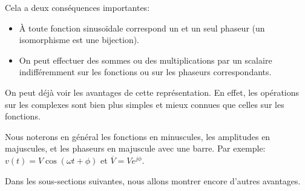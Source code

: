 Cela a deux conséquences importantes:
\begin{itemize}
    \item À toute fonction sinusoïdale correspond un et un seul phaseur
        (un isomorphisme est une bijection).
    \item On peut effectuer des sommes ou des multiplications par un scalaire
        indifféremment sur les fonctions ou sur les phaseurs correspondants.
\end{itemize}

On peut déjà voir les avantages de cette représentation.
En effet,
les opérations sur les complexes sont bien plus simples et mieux connues
que celles sur les fonctions.

Nous noterons en général les fonctions en minuscules,
les amplitudes en majuscules,
et les phaseurs en majuscule avec une barre.
Par exemple: $v(t) = V\cos(\omega t + \phi)$ et
$\overline{V} = Ve^{j\phi}$.

Dans les sous-sections suivantes, nous allons montrer
encore d'autres avantages.
